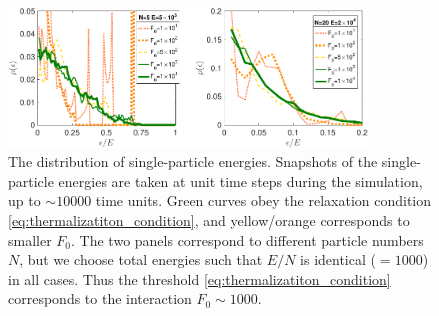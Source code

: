 \documentclass[a4paper, onecolumn]{revtex4-1}
\begin{document}
\begin{figure}[tb]
\centering
%
\includegraphics[width=0.85\textwidth]{ZhiyuPictures/Boltzmann_2panels_01-crop.pdf}
%
\caption{The distribution of single-particle energies.  Snapshots of the single-particle energies
  are taken at unit time steps during the simulation, up to $\sim 10000$ time units.  Green curves
  obey the relaxation condition \eqref{eq:thermalizatiton_condition}, and yellow/orange corresponds
  to smaller $F_0$.  The two panels correspond to different particle numbers $N$, but we choose
  total energies such that $E/N$ is identical ($=1000$) in all cases.  Thus the threshold
  \eqref{eq:thermalizatiton_condition} corresponds to the interaction $F_0\sim1000$. }
\label{fig:thermalization5}
\end{figure}
\end{document}
